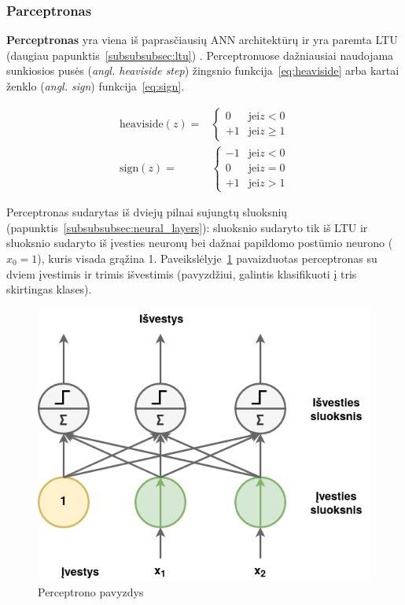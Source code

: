 \documentclass{VUMIFPSbakalaurinis}
\begin{document}
\subsubsection{Parceptronas}\label{subsubsec:perceptron}
{
	\textbf{Perceptronas} yra viena iš paprasčiausių ANN architektūrų ir yra paremta LTU (daugiau papunktis~\ref{subsubsubsec:ltu}) \cite{rosenblatt1957perceptron}. Perceptronuose dažniausiai naudojama sunkiosios pusės (\textit{angl. heaviside step}) žingsnio funkcija~\ref{eq:heaviside} arba kartai ženklo (\textit{angl. sign}) funkcija~\ref{eq:sign}.
	
	\begin{align}
		\label{eq:heaviside}
		\textrm{heaviside} (z) = &
		\begin{cases} 
			0 & \textrm{jei} z < 0 \\ 
			+1 & \textrm{jei} z \geq 1 
		\end{cases} \\
		\label{eq:sign}
		\textrm{sign} (z) = &
		\begin{cases} 
			-1 & \textrm{jei} z < 0 \\ 
			0 & \textrm{jei} z = 0 \\ 
			+1 & \textrm{jei} z > 1 
		\end{cases}
	\end{align}
	
	Perceptronas sudarytas iš dviejų pilnai sujungtų sluoksnių (papunktis~\ref{subsubsubsec:neural_layers}): sluoksnio sudaryto tik iš LTU ir sluoksnio sudaryto iš įvesties neuronų bei dažnai papildomo postūmio neurono (\(x_0 = 1\)), kuris visada grąžina 1. Paveikslėlyje~\ref{img:perceptron} pavaizduotas perceptronas su dviem įvestimis ir trimis išvestimis (pavyzdžiui, galintis klasifikuoti į tris skirtingas klases).
	
	
	\begin{figure}[H]
		\centering
		\includegraphics[scale=0.5]{img/perceptron}
		\caption{Perceptrono pavyzdys}
		\label{img:perceptron}
	\end{figure} 
	
}
\end{document}
